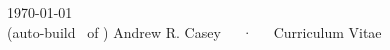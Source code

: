 \documentclass[11pt, a4paper]{awesome-cv}
\begin{document}
\makecvheader

\makecvfooter
  {\today\\(auto-build \githash\ of \giturl)}
  {Andrew R. Casey~~~·~~~Curriculum Vitae}
  {\thepage}






\clearpage



\clearpage



\clearpage

\end{document}

